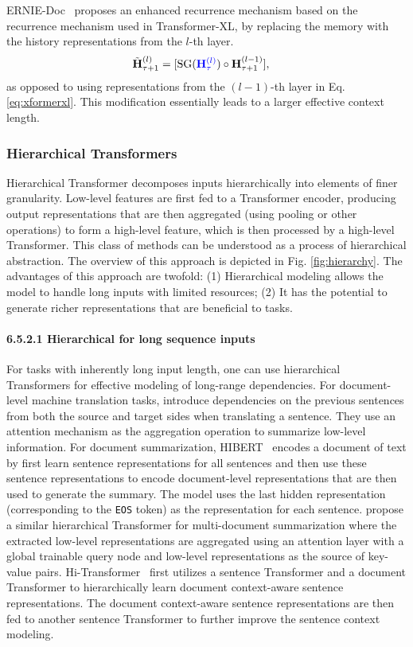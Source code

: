 \documentclass[manuscript,acmsmall,screen,nonacm]{acmart}
\theoremstyle{definition}
\begin{document}
ERNIE-Doc~\cite{ding2020erniedoc} proposes an enhanced recurrence mechanism based on the recurrence mechanism used in Transformer-XL, by replacing the memory with the history representations from the $l$-th layer.
\ifx \smv \undefined
\begin{align}
    \tilde{\bH}_{\tau+1}^{(l)}&=[\mathrm{SG}(\textcolor[rgb]{0,0,1}{\bH_\tau^{(l)}})\circ \bH_{\tau+1}^{(l-1)}],
\end{align}
as opposed to using representations from the $(l-1)$-th layer in Eq. \eqref{eq:xformerxl}. This modification essentially leads to a larger effective context length.
\fi

\subsubsection{Hierarchical Transformers}
Hierarchical Transformer decomposes inputs hierarchically into elements of finer granularity. Low-level features are first fed to a Transformer encoder, producing output representations that are then aggregated (using pooling or other operations) to form a high-level feature, which is then processed by a high-level Transformer. This class of methods can be understood as a process of hierarchical abstraction. The overview of this approach is depicted in Fig. \ref{fig:hierarchy}. The advantages of this approach are twofold: (1) Hierarchical modeling allows the model to handle long inputs with limited resources; (2) It has the potential to generate richer representations that are beneficial to tasks.


\paragraph{6.5.2.1 Hierarchical for long sequence inputs}
For tasks with inherently long input length, one can use hierarchical Transformers for effective modeling of long-range dependencies. For document-level machine translation tasks, \citet{miculicich-etal-2018-document} introduce dependencies on the previous sentences from both the source and target sides when translating a sentence. They use an attention mechanism as the aggregation operation to summarize low-level information. For document summarization, HIBERT~\cite{zhang-etal-2019-hibert} encodes a document of text by first learn sentence representations for all sentences and then use these sentence representations to encode document-level representations that are then used to generate the summary. The model uses the last hidden representation (corresponding to the \texttt{EOS} token) as the representation for each sentence. \citet{liu-lapata-2019-hierarchical} propose a similar hierarchical Transformer for multi-document summarization where the extracted low-level representations are aggregated using an attention layer with a global trainable query node and low-level representations as the source of key-value pairs. Hi-Transformer~\cite{wu2021hitransformer} first utilizes a sentence Transformer and a document Transformer to hierarchically learn document context-aware sentence representations. The document context-aware sentence representations are then fed to another sentence Transformer to further improve the sentence context modeling.
\end{document}
